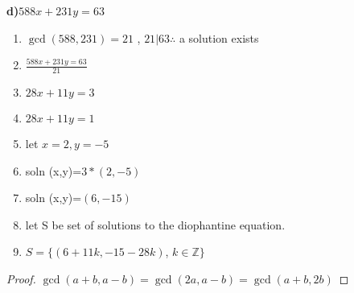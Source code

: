 \documentclass[12pt]{article}
\newcommand{\Z}{\mathbb{Z}}
\newenvironment{question}[2][Question]{\begin{trivlist}
\item[\hskip \labelsep {\bfseries #1}\hskip \labelsep {\bfseries #2.}]}{\end{trivlist}}
\begin{document}
\begin{question}{6.9}
\textbf{d)}$588x+231y=63$\\
\begin{enumerate}
	\item $\gcd(588,231)=21$ , $21 | 63 \therefore$ a solution exists
	\item $\frac{588x+231y=63}{21}$
	\item $28x+11y=3$
	\item $28x+11y=1$
	\item let $x=2,y=-5$
	\item soln (x,y)=$3*(2,-5)$
	\item soln (x,y)=$(6,-15)$
	\item let S be set of solutions to the diophantine equation.
	\item $S = \{(6+11k, -15-28k)$, $k \in \Z \}$
\end{enumerate}
\end{question}
\begin{question}{6.17}
\begin{proof}
$\gcd(a+b,a-b)=\gcd(2a,a-b)=\gcd(a+b,2b)$	
\end{proof}
\end{question}
\end{document}
